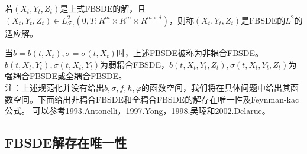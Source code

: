		若$(X_t,Y_t,Z_t)$是上式FBSDE的解，且$\left( {{X_t},{Y_t},{Z_t}} \right) \in L_{\mathcal{F}_t} ^2( {0,T; {{R^m}\times{R^m} \times {R^{m \times d}}} })$，则称$\left( {{X_t},{Y_t},{Z_t}} \right)$是FBSDE的$L^2$的适应解。
		\par
		当$b=b(t,X_t),\sigma=\sigma(t,X_t)$时，上述FBSDE被称为非耦合FBSDE。$b( {t,{X_t},{Y_t}} ),\sigma( {t,{X_t},{Y_t}} )$为弱耦合FBSDE，$b( {t,{X_t},{Y_t},{Z_t}} ),\sigma( {t,{X_t},{Y_t},{Z_t}} )$为强耦合FBSDE或全耦合FBSDE。\\
		注：上述规范化并没有给出$b,\sigma,f,h,\varphi$的函数空间，我们将在具体问题中给出其函数空间。下面给出非耦合FBSDE和全耦合FBSDE的解存在唯一性及Feynman-kac公式。
		可以参考1993.Antonelli\cite{1993.Antonelli}，1997.Yong\cite{1997.Yong}，1998.吴瑧\cite{wu.1998}和2002.Delarue\cite{2002.Delarue}。

	\subsection{FBSDE解存在唯一性}
